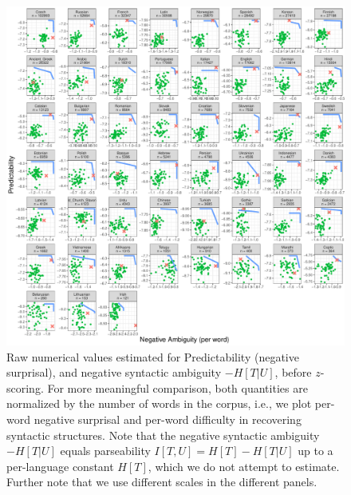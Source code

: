 \documentclass[10pt,twoside,lineno]{article}
\begin{document}
\begin{figure}
\centering
\includegraphics[width=\textwidth]{../results/plane/pareto-plane-perLanguage-raw-WithN.pdf}
	\caption[Predictability and Parseability]{Raw numerical values estimated for Predictability (negative surprisal), and negative syntactic ambiguity $-H[T|U]$, before $z$-scoring. For more meaningful comparison, both quantities are normalized by the number of words in the corpus, i.e., we plot per-word negative surprisal and per-word difficulty in recovering syntactic structures.  Note that the negative syntactic ambiguity $-H[T|U]$ equals parseability $I[T,U] = H[T] - H[T|U]$ up to a per-language constant $H[T]$, which we do not attempt to estimate. Further note that we use different scales in the different panels. }\label{fig:pareto-per-lang-raw}
\end{figure}



%



\end{document}
